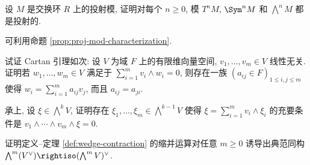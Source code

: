 \begin{Exercises}
	\item 设 $M$ 是交换环 $R$ 上的投射模, 证明对每个 $n \geq 0$, 模 $T^n M$, $\Sym^n M$ 和 $\bigwedge^n M$ 都是投射的. \begin{hint}可利用命题 \ref{prop:proj-mod-characterization}.\end{hint}
	\item 试证 Cartan 引理如次: 设 $V$ 为域 $F$ 上的有限维向量空间, $v_1, \ldots, v_m \in V$ 线性无关. 证明若 $w_1, \ldots, w_m \in V$ 满足于 $\sum_{i=1}^m v_i \wedge w_i = 0$, 则存在一族 $\left( a_{ij} \in F \right)_{1 \leq i,j \leq m}$ 使得 $w_i = \sum_{i=1}^m a_{ij} v_j$, 而且 $a_{ij} = a_{ji}$.
	\item 承上, 设 $\xi \in \bigwedge^k V$, 证明存在 $\xi_1, \ldots, \xi_m \in \bigwedge^{k-1} V$ 使得 $\xi = \sum_{i=1}^m v_i \wedge \xi_i$ 的充要条件是 $v_1 \wedge \cdots \wedge v_m \wedge \xi = 0$.
	\item 证明定义--定理 \ref{def:wedge-contraction} 的缩并运算对任意 $m \geq 0$ 诱导出典范同构 $\bigwedge^m(V^\vee) \rightiso (\bigwedge^m V)^\vee$.
\end{Exercises}
